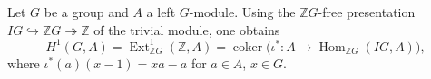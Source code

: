 Let $G$ be a group and $A$ a left $G$-module. Using the $\mathbb{Z}G$-free presentation $IG \hookrightarrow \mathbb{Z}G \twoheadrightarrow \mathbb{Z}$ of the trivial module, one obtains
$$H^1(G, A) = \operatorname{Ext}_{\mathbb{Z}G}^1(\mathbb{Z}, A) = \operatorname{coker}\!\big( \iota^* : A \to \operatorname{Hom}_{\mathbb{Z}G}(IG, A) \big),$$
where $\iota^*(a)(x-1) = xa - a$ for $a \in A$, $x \in G$.
